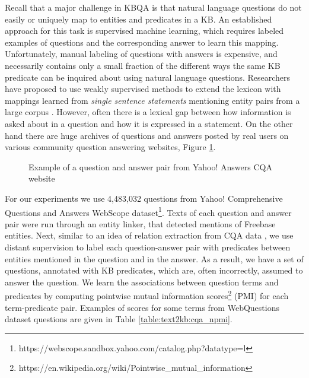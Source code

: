 Recall that a major challenge in KBQA is that natural language questions do not easily or uniquely map to entities and predicates in a KB. An established approach for this task is supervised machine learning, which requires labeled examples of questions and the corresponding answer to learn this mapping. Unfortunately, manual labeling of questions with answers is expensive, and necessarily contains only a small fraction of the different ways the same KB predicate can be inquired about using natural language questions. Researchers have proposed to use weakly supervised methods to extend the lexicon with mappings learned from \textit{single sentence statements} mentioning entity pairs from a large corpus \cite{YaoD14}.
However, often there is a lexical gap between how information is asked about in a question and how it is expressed in a statement.
On the other hand there are huge archives of questions and answers posted by real users on various community question answering websites, \eg Figure \ref{fig:text2kb:cqa_example}.

\begin{figure}
\centering
{}
\caption{Example of a question and answer pair from Yahoo! Answers CQA website}
\label{fig:text2kb:cqa_example}
\end{figure}

For our experiments we use 4,483,032 questions from Yahoo! Comprehensive Questions and Answers WebScope dataset\footnote{https://webscope.sandbox.yahoo.com/catalog.php?datatype=l}.
Texts of each question and answer pair were run through an entity linker, that detected mentions of Freebase entities.
Next, similar to an idea of relation extraction from CQA data \cite{savenkov2015relation}, we use distant supervision to label each question-answer pair with predicates between entities mentioned in the question and in the answer.
As a result, we have a set of questions, annotated with KB predicates, which are, often incorrectly, assumed to answer the question.
We learn the associations between question terms and predicates by computing pointwise mutual information scores\footnote{https://en.wikipedia.org/wiki/Pointwise\_mutual\_information} (PMI) for each term-predicate pair.
Examples of scores for some terms from WebQuestions dataset questions are given in Table \ref{table:text2kb:cqa_npmi}.

